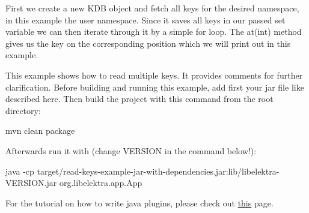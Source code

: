 First we create a new {\ttfamily K\+DB} object and fetch all keys for the desired namespace, in this example the {\ttfamily user} namespace. Since it saves all keys in our passed {\ttfamily set} variable we can then iterate through it by a simple for loop. The {\ttfamily at(int)} method gives us the key on the corresponding position which we will print out in this example.

This example shows how to read multiple keys. It provides comments for further clarification. Before building and running this example, add first your jar file like described here. Then build the project with this command from the root directory\+:


\begin{DoxyCode}
mvn clean package
\end{DoxyCode}


Afterwards run it with (change V\+E\+R\+S\+I\+ON in the command below!)\+:


\begin{DoxyCode}
java -cp target/read-keys-example-jar-with-dependencies.jar:lib/libelektra-VERSION.jar
       org.libelektra.app.App
\end{DoxyCode}


For the tutorial on how to write java plugins, please check out \hyperlink{doc_tutorials_java-plugins_md}{this} page. 